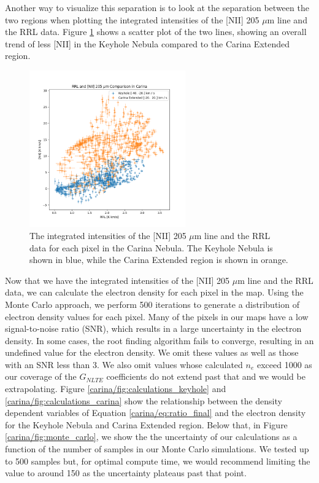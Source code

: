 Another way to visualize this separation is to look at the separation between the two regions when plotting the integrated intensities of the [NII] 205 $\mu$m line and the RRL data.
Figure \ref{carina/fig:intensity_scatter} shows a scatter plot of the two lines, showing an overall trend of less [NII] in the Keyhole Nebula compared to the Carina Extended region.

\begin{figure}
    \centering
    \includegraphics[width=0.6\textwidth]{figs/carina/intensity_scatter.png}
    \caption[Integrated Intensities of {[}NII{]} 205 $\mu$m Line and RRL Data]{
        The integrated intensities of the [NII] 205 $\mu$m line and the RRL data for each pixel in the Carina Nebula.
        The Keyhole Nebula is shown in blue, while the Carina Extended region is shown in orange.
        }
    \label{carina/fig:intensity_scatter}
\end{figure}

Now that we have the integrated intensities of the [NII] 205 $\mu$m line and the RRL data, we can calculate the electron density for each pixel in the map.
Using the Monte Carlo approach, we perform 500 iterations to generate a distribution of electron density values for each pixel.
Many of the pixels in our maps have a low signal-to-noise ratio (SNR), which results in a large uncertainty in the electron density.
In some cases, the root finding algorithm fails to converge, resulting in an undefined value for the electron density.
We omit these values as well as those with an SNR less than 3.
We also omit values whose calculated $n_e$ exceed 1000 as our coverage of the $G_{NLTE}$ coefficients do not extend past that and we would be extrapolating. 
Figure \ref{carina/fig:calculations_keyhole} and \ref{carina/fig:calculations_carina} show the relationship between the density dependent variables of Equation \ref{carina/eq:ratio_final} and the electron density for the Keyhole Nebula and Carina Extended region.
Below that, in Figure \ref{carina/fig:monte_carlo}, we show the the uncertainty of our calculations as a function of the number of samples in our Monte Carlo simulations.
We tested up to 500 samples but, for optimal compute time, we would recommend limiting the value to around 150 as the uncertainty plateaus past that point. 

